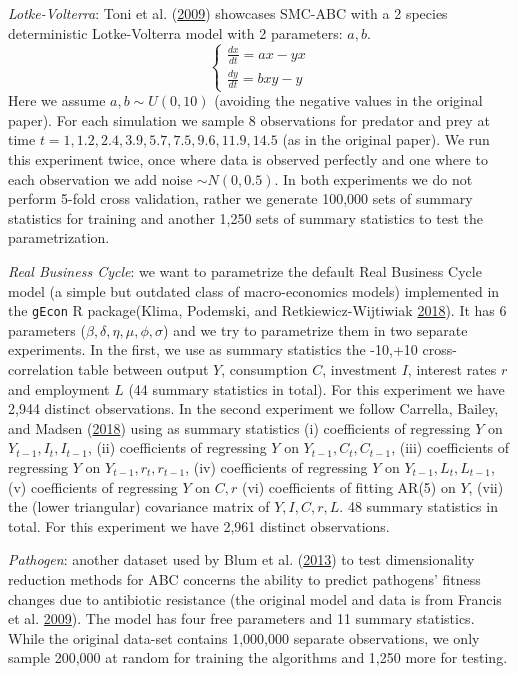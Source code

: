 \documentclass[]{article}
\begin{document}
\emph{Lotke-Volterra}: Toni et al. (\protect\hyperlink{ref-Toni2009}{2009}) showcases SMC-ABC with a 2 species deterministic Lotke-Volterra model with 2 parameters: \(a,b\).
\[
\left\{\begin{matrix}
 \frac{dx}{dt} = ax - yx \\ 
 \frac{dy}{dt} = bxy - y  
\end{matrix}\right.
\]
Here we assume \(a,b \sim U(0,10)\) (avoiding the negative values in the original paper). For each simulation we sample 8 observations for predator and prey at time \(t=1,1.2, 2.4, 3.9, 5.7, 7.5, 9.6, 11.9, 14.5\) (as in the original paper).
We run this experiment twice, once where data is observed perfectly and one where to each observation we add noise \(\sim N(0,0.5)\).
In both experiments we do not perform 5-fold cross validation, rather we generate 100,000 sets of summary statistics for training and another 1,250 sets of summary statistics to test the parametrization.

\emph{Real Business Cycle}: we want to parametrize the default Real Business Cycle model (a simple but outdated class of macro-economics models) implemented in the \texttt{gEcon} R package(Klima, Podemski, and Retkiewicz-Wijtiwiak \protect\hyperlink{ref-Klima2018}{2018}).
It has 6 parameters (\(\beta,\delta,\eta,\mu,\phi,\sigma\)) and we try to parametrize them in two separate experiments.
In the first, we use as summary statistics the -10,+10 cross-correlation table between output \(Y\), consumption \(C\), investment \(I\), interest rates \(r\) and employment \(L\) (44 summary statistics in total). For this experiment we have 2,944 distinct observations.
In the second experiment we follow Carrella, Bailey, and Madsen (\protect\hyperlink{ref-Carrella2018}{2018}) using as summary statistics (i) coefficients of regressing \(Y\) on \(Y_{t-1},I_{t},I_{t-1}\), (ii) coefficients of regressing \(Y\) on \(Y_{t-1},C_{t},C_{t-1}\), (iii) coefficients of regressing \(Y\) on \(Y_{t-1},r_{t},r_{t-1}\), (iv) coefficients of regressing \(Y\) on \(Y_{t-1},L_{t},L_{t-1}\), (v) coefficients of regressing \(Y\) on \(C,r\) (vi) coefficients of fitting AR(5) on \(Y\), (vii) the (lower triangular) covariance matrix of \(Y,I,C,r,L\). 48 summary statistics in total. For this experiment we have 2,961 distinct observations.

\emph{Pathogen}: another dataset used by Blum et al. (\protect\hyperlink{ref-Blum2013}{2013}) to test dimensionality reduction methods for ABC concerns the ability to predict pathogens' fitness changes due to antibiotic resistance (the original model and data is from Francis et al. \protect\hyperlink{ref-Francis2009}{2009}). The model has four free parameters and 11 summary statistics.
While the original data-set contains 1,000,000 separate observations, we only sample 200,000 at random for training the algorithms and 1,250 more for testing.
\end{document}
